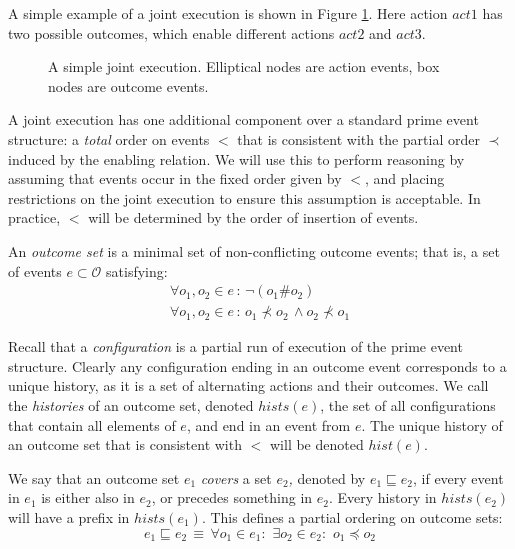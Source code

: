 A simple example of a joint execution is shown in Figure \ref{fig:example-je}.
Here action $act1$ has two possible outcomes, which enable different
actions $act2$ and $act3$.

%
\begin{figure}

\caption{ A simple joint execution. Elliptical nodes are action events, box
nodes are outcome events. }


\label{fig:example-je} 
\end{figure}


A joint execution has one additional component over a standard prime
event structure: a \emph{total} order on events $<$ that is consistent
with the partial order $\prec$ induced by the enabling relation.
We will use this to perform reasoning by assuming that events occur
in the fixed order given by $<$, and placing restrictions on the
joint execution to ensure this assumption is acceptable. In practice,
$<$ will be determined by the order of insertion of events.

An \emph{outcome set} is a minimal set of non-conflicting outcome
events; that is, a set of events $e\subset\mathcal{O}$ satisfying:\begin{gather*}
\forall o_{1},o_{2}\in e\,:\,\neg(o_{1}\#o_{2})\\
\forall o_{1},o_{2}\in e\,:\, o_{1}\not\prec o_{2}\,\wedge o_{2}\not\prec o_{1}\end{gather*}


Recall that a \emph{configuration} is a partial run of execution of
the prime event structure. Clearly any configuration ending in an
outcome event corresponds to a unique history, as it is a set of alternating
actions and their outcomes. We call the \emph{histories} of an outcome
set, denoted $hists(e)$, the set of all configurations that contain
all elements of $e$, and end in an event from $e$. The unique history
of an outcome set that is consistent with $<$ will be denoted $hist(e)$.

We say that an outcome set $e_{1}$ \emph{covers} a set \emph{$e_{2}$,}
denoted by $e_{1}\sqsubseteq e_{2}$, if every event in $e_{1}$ is
either also in $e_{2}$, or precedes something in $e_{2}$. Every
history in $hists(e_{2})$ will have a prefix in $hists(e_{1})$.
This defines a partial ordering on outcome sets:\[
e_{1}\sqsubseteq e_{2}\,\equiv\,\forall o_{1}\in e_{1}:\,\,\exists o_{2}\in e_{2}:\,\, o_{1}\preceq o_{2}\]


